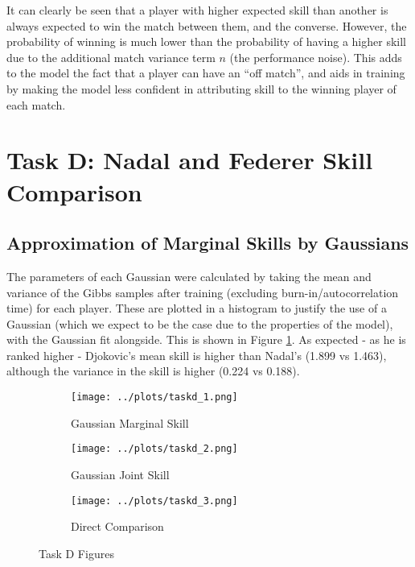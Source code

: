 \documentclass[11pt]{amsart}
\begin{document}
It can clearly be seen that a player with higher expected skill than another is always expected to win the match between them, and the converse. However, the probability of winning is much lower than the probability of having a higher skill due to the additional match variance term $n$ (the performance noise). This adds to the model the fact that a player can have an ``off match'', and aids in training by making the model less confident in attributing skill to the winning player of each match.


\section{Task D: Nadal and Federer Skill Comparison} \label{sec:d}
\subsection{Approximation of Marginal Skills by Gaussians}
The parameters of each Gaussian were calculated by taking the mean and variance of the Gibbs samples after training (excluding burn-in/autocorrelation time) for each player. These are plotted in a histogram to justify the use of a Gaussian (which we expect to be the case due to the properties of the model), with the Gaussian fit alongside. This is shown in Figure \ref{fig:td_gaussian}. As expected - as he is ranked higher - Djokovic's mean skill is higher than Nadal's (1.899 vs 1.463), although the variance in the skill is higher (0.224 vs 0.188).

\begin{figure}[h]
    \centering
    \begin{subfigure}[b]{0.32\textwidth}
        \centering
        \texttt{[image: ../plots/taskd\_1.png]}
        \caption{Gaussian Marginal Skill}
        \label{fig:td_gaussian}
    \end{subfigure}
    \hfill
    \begin{subfigure}[b]{0.32\textwidth}
        \centering
        \texttt{[image: ../plots/taskd\_2.png]}
        \caption{Gaussian Joint Skill}
        \label{fig:td_2}
    \end{subfigure}
    \hfill
    \begin{subfigure}[b]{0.32\textwidth}
        \centering
        \texttt{[image: ../plots/taskd\_3.png]}
        \caption{Direct Comparison}
        \label{fig:td_3}
    \end{subfigure}
    \caption{Task D Figures}
\end{figure} \label{fig:taskd_all}
\end{document}
